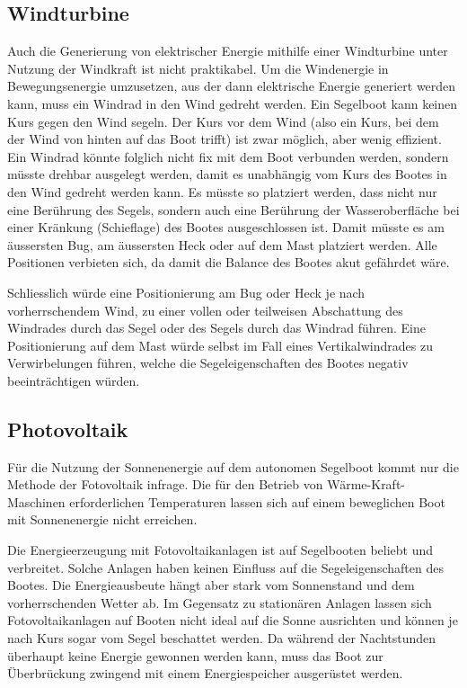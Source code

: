 \subsection{Windturbine}
Auch die Generierung von elektrischer Energie mithilfe einer Windturbine unter Nutzung der Windkraft ist nicht praktikabel. Um die Windenergie in Bewegungsenergie umzusetzen, aus der dann elektrische Energie generiert werden kann, muss ein Windrad in den Wind gedreht werden. Ein Segelboot kann keinen Kurs gegen den Wind segeln. Der Kurs vor dem Wind (also ein Kurs, bei dem der Wind von hinten auf das Boot trifft) ist zwar möglich, aber wenig effizient. Ein Windrad könnte folglich nicht fix mit dem Boot verbunden werden, sondern müsste drehbar ausgelegt werden, damit es unabhängig vom Kurs des Bootes in den Wind gedreht werden kann. Es müsste so platziert werden, dass nicht nur eine Berührung des Segels, sondern auch eine Berührung der Wasseroberfläche bei einer Kränkung (Schieflage) des Bootes ausgeschlossen ist. Damit müsste es am äussersten Bug, am äussersten Heck oder auf dem Mast platziert werden. Alle Positionen verbieten sich, da damit die Balance des Bootes akut gefährdet wäre. 

Schliesslich würde eine Positionierung am Bug oder Heck je nach vorherrschendem Wind, zu einer vollen oder teilweisen Abschattung des Windrades durch das Segel oder des Segels durch das Windrad führen. Eine Positionierung auf dem Mast würde selbst im Fall eines Vertikalwindrades zu Verwirbelungen führen, welche die Segeleigenschaften des Bootes negativ beeinträchtigen würden.

\subsection{Photovoltaik}
Für die Nutzung der Sonnenenergie auf dem autonomen Segelboot kommt nur die Methode der Fotovoltaik infrage. Die für den Betrieb von Wärme-Kraft-Maschinen erforderlichen Temperaturen lassen sich auf einem beweglichen Boot mit Sonnenenergie nicht erreichen.

Die Energieerzeugung mit Fotovoltaikanlagen ist auf Segelbooten beliebt und verbreitet. Solche Anlagen haben keinen Einfluss auf die Segeleigenschaften des Bootes. Die Energieausbeute hängt aber stark vom Sonnenstand und dem vorherrschenden Wetter ab. Im Gegensatz zu stationären Anlagen lassen sich Fotovoltaikanlagen auf Booten nicht ideal auf die Sonne ausrichten und können je nach Kurs sogar vom Segel beschattet werden. Da während der Nachtstunden überhaupt keine Energie gewonnen werden kann, muss das Boot zur Überbrückung zwingend mit einem Energiespeicher ausgerüstet werden.

